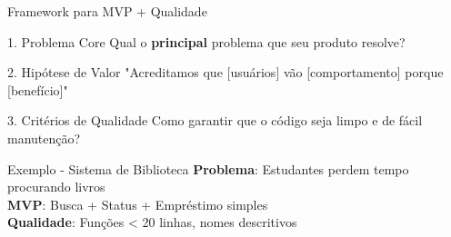 \documentclass[10pt]{beamer}
\begin{document}
\begin{frame}{Framework para MVP + Qualidade}
\begin{block}{1. Problema Core}
Qual o \textbf{principal} problema que seu produto resolve?
\end{block}

\begin{block}{2. Hipótese de Valor}
"Acreditamos que [usuários] vão [comportamento] porque [benefício]"
\end{block}

\begin{block}{3. Critérios de Qualidade}
Como garantir que o código seja limpo e de fácil manutenção?
\end{block}

\vspace{0.3cm}
\begin{exampleblock}{Exemplo - Sistema de Biblioteca}
\textbf{Problema}: Estudantes perdem tempo procurando livros \\
\textbf{MVP}: Busca + Status + Empréstimo simples \\
\textbf{Qualidade}: Funções < 20 linhas, nomes descritivos
\end{exampleblock}
\end{frame}
\end{document}
